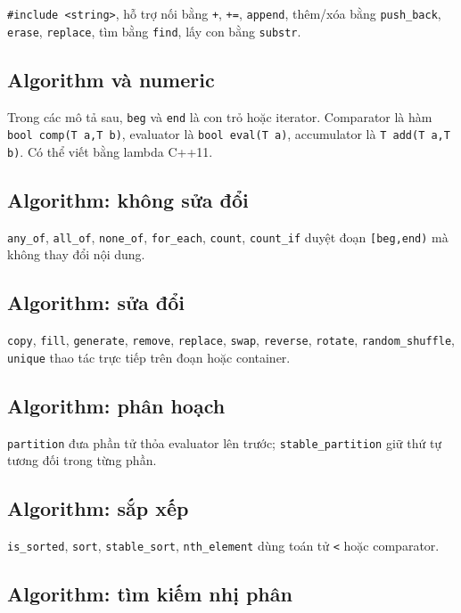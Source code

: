 \documentclass[11pt]{article}
\begin{document}
\texttt{\#include <string>}, hỗ trợ nối bằng \texttt{+}, \texttt{+=}, \texttt{append}, thêm/xóa bằng \texttt{push\_back}, \texttt{erase}, \texttt{replace}, tìm bằng \texttt{find}, lấy con bằng \texttt{substr}.

\subsection{Algorithm và numeric}

Trong các mô tả sau, \texttt{beg} và \texttt{end} là con trỏ hoặc iterator. Comparator là hàm \texttt{bool comp(T a,T b)}, evaluator là \texttt{bool eval(T a)}, accumulator là \texttt{T add(T a,T b)}. Có thể viết bằng lambda C++11.

\subsection{Algorithm: không sửa đổi}

\texttt{any\_of}, \texttt{all\_of}, \texttt{none\_of}, \texttt{for\_each}, \texttt{count}, \texttt{count\_if} duyệt đoạn \texttt{[beg,end)} mà không thay đổi nội dung.

\subsection{Algorithm: sửa đổi}

\texttt{copy}, \texttt{fill}, \texttt{generate}, \texttt{remove}, \texttt{replace}, \texttt{swap}, \texttt{reverse}, \texttt{rotate}, \texttt{random\_shuffle}, \texttt{unique} thao tác trực tiếp trên đoạn hoặc container.

\subsection{Algorithm: phân hoạch}

\texttt{partition} đưa phần tử thỏa evaluator lên trước; \texttt{stable\_partition} giữ thứ tự tương đối trong từng phần.

\subsection{Algorithm: sắp xếp}

\texttt{is\_sorted}, \texttt{sort}, \texttt{stable\_sort}, \texttt{nth\_element} dùng toán tử \texttt{<} hoặc comparator.

\subsection{Algorithm: tìm kiếm nhị phân}
\end{document}
